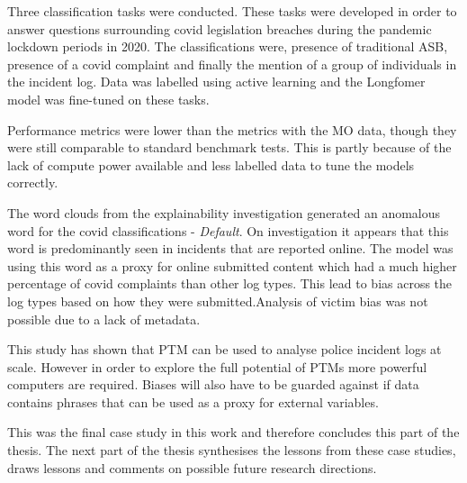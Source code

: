 Three classification tasks were conducted. These tasks were developed in order to answer questions surrounding covid legislation breaches during the pandemic lockdown periods in 2020. The classifications were, presence of traditional ASB, presence of a covid complaint and finally the mention of a group of individuals in the incident log. Data was labelled using active learning and the Longfomer model was fine-tuned on these tasks.

Performance metrics were lower than the metrics with the MO data, though they were still comparable to standard benchmark tests. This is partly because of the lack of compute power available  and less labelled data to tune the models correctly.

The word clouds from the explainability investigation generated an anomalous word for the covid classifications - \emph{Default}. On investigation it appears that this word is predominantly seen in incidents that are reported online. The model was using this word as a proxy for online submitted content which had a much higher percentage of covid complaints than other log types. This lead to bias across the log types based on how they were submitted.Analysis of victim bias was not possible due to a lack of metadata. 


This study has shown that PTM can be used to analyse police incident logs at scale. However in order to explore the full potential of PTMs more powerful computers are required. Biases will also have to be guarded against if data contains phrases that can be used as a proxy for external variables.

This was the final case study in this work and therefore concludes this part of the thesis. The next part of the thesis synthesises the lessons from these case studies, draws lessons and comments on possible future research directions.
 


